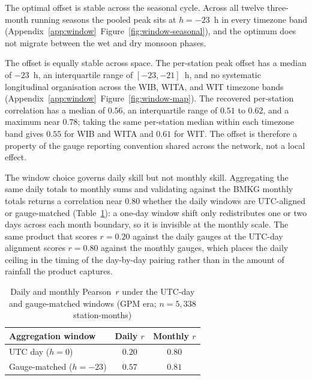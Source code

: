 The optimal offset is stable across the seasonal cycle. Across all
twelve three-month running seasons the pooled peak sits at
$h = -23$~h in every timezone band
(Appendix~\ref{app:window}~Figure~\ref{fig:window-seasonal}), and
the optimum does not
migrate between the wet and dry monsoon phases.

The offset is equally stable across space. The per-station peak
offset has a median of $-23$~h, an interquartile range of
$[-23, -21]$~h, and no systematic longitudinal organisation across
the WIB, WITA, and WIT timezone bands
(Appendix~\ref{app:window}~Figure~\ref{fig:window-map}). The recovered per-station
correlation has a median of $0.56$, an interquartile range of
$0.51$ to $0.62$, and a maximum near $0.78$; taking the same
per-station median within each timezone band gives $0.55$ for WIB
and WITA and $0.61$ for WIT. The offset is therefore a property of the gauge
reporting convention shared across the network, not a local effect.

The window choice governs daily skill but not monthly skill.
Aggregating the same daily totals to monthly sums and validating
against the BMKG monthly totals returns a correlation near $0.80$
whether the daily windows are UTC-aligned or gauge-matched
(Table~\ref{tab:window-monthly}): a one-day window shift only
redistributes one or two days across each month boundary, so it is
invisible at the monthly scale. The same product that scores
$r = 0.20$ against the daily gauges at the UTC-day alignment scores
$r = 0.80$ against the monthly gauges, which places the daily
ceiling in the timing of the day-by-day pairing rather than in the
amount of rainfall the product captures.

\begin{table}[H]
\centering
\caption[Daily versus monthly correlation under two aggregation windows]{Daily
and monthly Pearson~$r$ under the UTC-day and gauge-matched windows
(GPM era; $n = 5{,}338$ station-months)}
\label{tab:window-monthly}
\begin{tabular*}{\textwidth}{@{\extracolsep{\fill}}lcc@{}}
\toprule
Aggregation window & Daily $r$ & Monthly $r$ \\
\midrule
UTC day ($h = 0$)        & $0.20$ & $0.80$ \\
Gauge-matched ($h = -23$) & $0.57$ & $0.81$ \\
\bottomrule
\end{tabular*}
\end{table}

